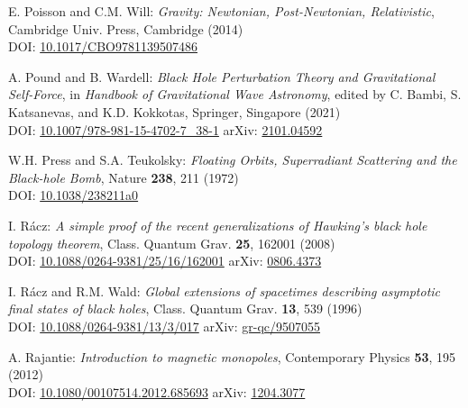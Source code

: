 \begin{thebibliography}{123}
E. Poisson and C.M. Will: {\em Gravity: Newtonian, Post-Newtonian, Relativistic},
Cambridge Univ. Press, Cambridge (2014) \\
DOI: \href{https://doi.org/10.1017/CBO9781139507486}{10.1017/CBO9781139507486}

A. Pound and B. Wardell:
{\em Black Hole Perturbation Theory and Gravitational Self-Force},
in {\em Handbook of Gravitational Wave Astronomy}, edited by
C. Bambi, S. Katsanevas, and K.D. Kokkotas,
Springer, Singapore (2021)\\
DOI: \href{https://doi.org/10.1007/978-981-15-4702-7_38-1}{10.1007/978-981-15-4702-7\_38-1}\hfill
arXiv: \href{https://arxiv.org/abs/2101.04592}{2101.04592}

W.H. Press and S.A. Teukolsky:
{\em Floating Orbits, Superradiant Scattering and the Black-hole Bomb},
Nature {\bf 238}, 211 (1972)\\
DOI: \href{https://doi.org/10.1038/238211a0}{10.1038/238211a0}

I. R\'acz:
{\em A simple proof of the recent generalizations of Hawking's black hole topology theorem},
Class. Quantum Grav. {\bf 25}, 162001 (2008)\\
DOI: \href{https://doi.org/10.1088/0264-9381/25/16/162001}{10.1088/0264-9381/25/16/162001}\hfill
arXiv: \href{https://arxiv.org/abs/0806.4373}{0806.4373}

I. R\'acz and R.M. Wald:
{\em Global extensions of spacetimes describing asymptotic final states of black holes},
Class. Quantum Grav. {\bf 13}, 539 (1996)\\
DOI: \href{https://doi.org/10.1088/0264-9381/13/3/017}{10.1088/0264-9381/13/3/017}\hfill
arXiv: \href{https://arxiv.org/abs/gr-qc/9507055}{gr-qc/9507055}

A. Rajantie:
{\em Introduction to magnetic monopoles},
Contemporary Physics {\bf 53}, 195 (2012)\\
DOI: \href{https://doi.org/10.1080/00107514.2012.685693}{10.1080/00107514.2012.685693}\hfill
arXiv: \href{https://arxiv.org/abs/1204.3077}{1204.3077}


\end{thebibliography}
